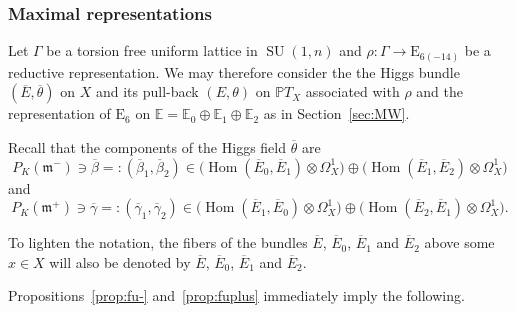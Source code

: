 \documentclass[JEP,XML,SOM,Unicode,NoFloatCountersInSection]{cedram}
\theoremstyle{plain}
\theoremstyle{definition}
\let\ov\overline
\DeclareMathOperator{\Hom}{Hom}
\DeclareMathOperator{\SU}{SU}
\newcommand{\bE}{\mathbb{E}}
\newcommand{\PTX}{{\mathbb{P}T_X}}
\newcommand{\fm}{\mathfrak{m}}
\newcommand{\ovE}{\ov{E}}
\newcommand{\ovb}{\ov{\beta}}
\newcommand{\ovg}{\ov{\gamma}}
\newcommand{\ovt}{\ov{\theta}}
\begin{document}
\subsubsection{Maximal representations}

Let $\Gamma$ be a torsion free uniform lattice in $\SU(1,n)$ and $\rho:\Gamma\to \mathrm{E}_{6(-14)}$ be a
reductive representation.
We may therefore
consider the the Higgs bundle $(\ovE,\ovt)$ on $X$ and its pull-back $(E,\theta)$ on $\PTX$
associated with $\rho$ and the representation of $\mathrm{E}_{6}$ on
$\bE=\bE_0\oplus\bE_1\oplus\bE_2$ as in Section~\ref{sec:MW}.

Recall that the components of the Higgs field $\ovt$ are
$$
P_K(\fm^-)\ni\ovb=:(\ovb_1,\ovb_2)\in\bigl(\Hom(\ovE_0,\ovE_1)\otimes\Omega^1_X \bigr)\oplus \bigl(\Hom(\ovE_1,\ovE_2)\otimes\Omega^1_X \bigr)
$$
and
$$
P_K(\fm^+)\ni\ovg=:(\ovg_1,\ovg_2)\in \bigl(\Hom(\ovE_1,\ovE_0)\otimes\Omega^1_X \bigr)\oplus \bigl(\Hom(\ovE_2,\ovE_1)\otimes\Omega^1_X \bigr).
$$

To lighten the notation, the fibers of the bundles $\ovE$, $\ovE_0$, $\ovE_1$ and
$\ovE_2$ above some $x\in X$ will also be denoted by $\ovE$, $\ovE_0$, $\ovE_1$ and
$\ovE_2$.

Propositions~\ref{prop:fu-} and~\ref{prop:fuplus} immediately imply the following.
\end{document}
